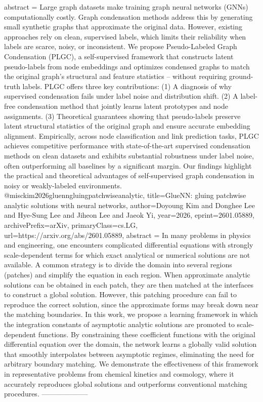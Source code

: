 {      abstract = {Large graph datasets make training graph neural networks (GNNs) computationally costly. Graph condensation methods address this by generating small synthetic graphs that approximate the original data. However, existing approaches rely on clean, supervised labels, which limits their reliability when labels are scarce, noisy, or inconsistent. We propose Pseudo-Labeled Graph Condensation (PLGC), a self-supervised framework that constructs latent pseudo-labels from node embeddings and optimizes condensed graphs to match the original graph's structural and feature statistics -- without requiring ground-truth labels. PLGC offers three key contributions: (1) A diagnosis of why supervised condensation fails under label noise and distribution shift. (2) A label-free condensation method that jointly learns latent prototypes and node assignments. (3) Theoretical guarantees showing that pseudo-labels preserve latent structural statistics of the original graph and ensure accurate embedding alignment. Empirically, across node classification and link prediction tasks, PLGC achieves competitive performance with state-of-the-art supervised condensation methods on clean datasets and exhibits substantial robustness under label noise, often outperforming all baselines by a significant margin. Our findings highlight the practical and theoretical advantages of self-supervised graph condensation in noisy or weakly-labeled environments.}
}@misc{kim2026gluenngluingpatchwiseanalytic,
      title={GlueNN: gluing patchwise analytic solutions with neural networks}, 
      author={Doyoung Kim and Donghee Lee and Hye-Sung Lee and Jiheon Lee and Jaeok Yi},
      year={2026},
      eprint={2601.05889},
      archivePrefix={arXiv},
      primaryClass={cs.LG},
      url={https://arxiv.org/abs/2601.05889},
      abstract = {In many problems in physics and engineering, one encounters complicated differential equations with strongly scale-dependent terms for which exact analytical or numerical solutions are not available. A common strategy is to divide the domain into several regions (patches) and simplify the equation in each region. When approximate analytic solutions can be obtained in each patch, they are then matched at the interfaces to construct a global solution. However, this patching procedure can fail to reproduce the correct solution, since the approximate forms may break down near the matching boundaries. In this work, we propose a learning framework in which the integration constants of asymptotic analytic solutions are promoted to scale-dependent functions. By constraining these coefficient functions with the original differential equation over the domain, the network learns a globally valid solution that smoothly interpolates between asymptotic regimes, eliminating the need for arbitrary boundary matching. We demonstrate the effectiveness of this framework in representative problems from chemical kinetics and cosmology, where it accurately reproduces global solutions and outperforms conventional matching procedures.}
}
        --------------------
        


